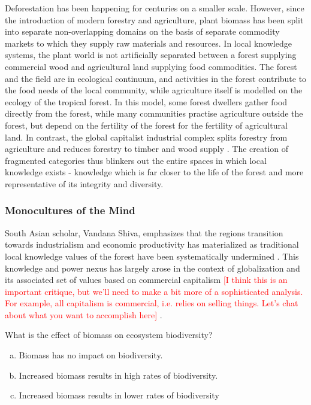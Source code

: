 Deforestation has been happening for centuries on a smaller scale. However, since the introduction of modern forestry and agriculture, plant biomass has been split into separate non-overlapping domains on the basis of separate commodity markets to which they supply raw materials and resources. In local knowledge systems, the plant world is not artificially separated between a forest supplying commercial wood and agricultural land supplying food commodities. The forest and the field are in ecological continuum, and activities in the forest contribute to the food needs of the local community, while agriculture itself is modelled on the ecology of the tropical forest. In this model, some forest dwellers gather food directly from the forest, while many communities practise agriculture outside the forest, but depend on the fertility of the forest for the fertility of agricultural land. In contrast, the global capitalist industrial complex splits forestry from agriculture and reduces forestry to timber and wood supply \citep{de1989economic}. The creation of fragmented categories thus blinkers out the entire spaces in which local knowledge exists - knowledge which is far closer to the life of the forest and more representative of its integrity and diversity.

\subsubsection{Monocultures of the Mind}

South Asian scholar, Vandana Shiva, emphasizes that the regions transition towards industrialism and economic productivity has materialized as traditional local knowledge values of the forest have been systematically undermined \citep{shiva1993monocultures}. This knowledge and power nexus has largely arose in the context of globalization and its associated set of values based on commercial capitalism \textcolor{red}{[I think this is an important critique, but we'll need to make a bit more of a sophisticated analysis. For example, all capitalism is commercial, i.e. relies on selling things. Let's chat about what you want to accomplish here]} \citealp{king1993politik}.


\begin{exercise}
What is the effect of biomass on ecosystem biodiversity?
\begin{enumerate}[(a)]
\item Biomass has no impact on biodiversity.
\item Increased biomass results in high rates of biodiversity.
\item Increased biomass results in lower rates of biodiversity 
\end{enumerate}
\end{exercise}

